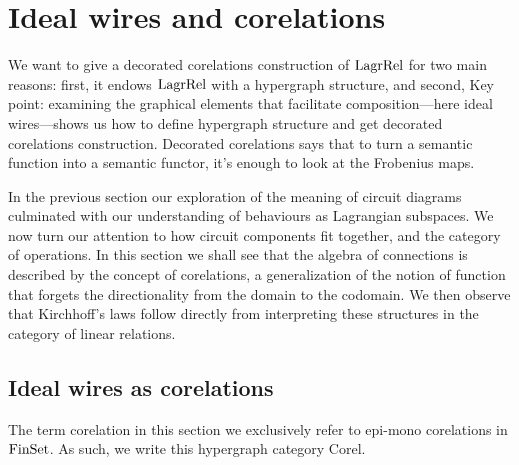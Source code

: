\section{Ideal wires and corelations} \label{sec:corel}
We want to give a decorated corelations construction of $\mathrm{LagrRel}$ for two main
reasons: first, it endows $\mathrm{LagrRel}$ with a hypergraph structure, and second, 
Key point: examining the graphical elements that facilitate composition---here
ideal wires---shows us how to define hypergraph structure and get decorated
corelations construction. Decorated corelations says that to turn a semantic
function into a semantic functor, it's enough to look at the Frobenius maps. 

In the previous section our exploration of the meaning of circuit diagrams 
culminated with our understanding of behaviours as Lagrangian subspaces.  We now 
turn our attention to how circuit components fit together, and the category of 
operations.  In this section we shall see that the algebra of connections is 
described by the concept of corelations, a generalization of the notion of 
function that forgets the directionality from the domain to the codomain. We
then observe that Kirchhoff's laws follow directly from interpreting these
structures in the category of linear relations.

\subsection{Ideal wires as corelations}

The term corelation in this section we exclusively refer to epi-mono corelations
in $\mathrm{FinSet}$. As such, we write this hypergraph category $\mathrm{Corel}$. 

